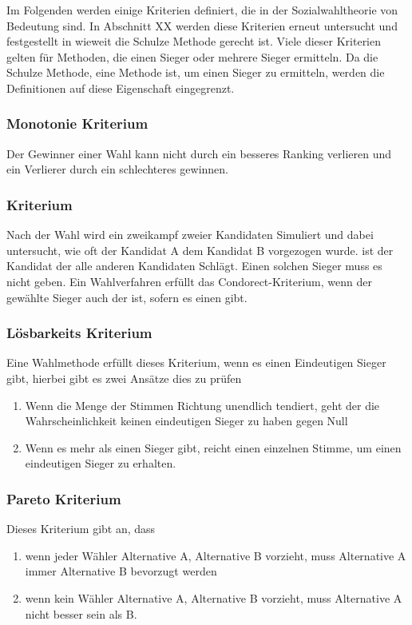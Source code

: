 Im Folgenden werden einige Kriterien definiert, die in der Sozialwahltheorie von Bedeutung sind. In Abschnitt XX werden diese Kriterien erneut untersucht und festgestellt in wieweit die Schulze Methode gerecht ist. Viele dieser Kriterien gelten für Methoden, die einen Sieger oder mehrere Sieger ermitteln. Da die Schulze Methode, eine Methode ist, um einen Sieger zu ermitteln, werden die Definitionen auf diese Eigenschaft eingegrenzt.

\subsubsection{Monotonie Kriterium} 
\label{sec:monotoniekriterium}
Der Gewinner einer Wahl kann nicht durch ein besseres Ranking verlieren und ein Verlierer durch ein schlechteres gewinnen. \cite{Woodall1996}

\subsubsection{\condorcet Kriterium} 
\label{sec:condorectKriterium}
Nach der Wahl wird ein zweikampf zweier Kandidaten Simuliert und dabei untersucht, wie oft der Kandidat A dem Kandidat B vorgezogen wurde. \condorcetSieger ist der Kandidat der alle anderen Kandidaten Schlägt. Einen solchen Sieger muss es nicht geben. Ein Wahlverfahren erfüllt das Condorect-Kriterium, wenn der gewählte Sieger auch der \condorcetSieger ist, sofern es einen \condorcetSieger gibt. \cite{Johnson2005}

\subsubsection{Lösbarkeits Kriterium} 
\label{sec:loesbarkeitsKriterium}
Eine Wahlmethode erfüllt dieses Kriterium, wenn es einen Eindeutigen Sieger gibt, hierbei gibt es zwei Ansätze dies zu prüfen \citet{Schulze2017}
\begin{enumerate}
\item Wenn die Menge der Stimmen Richtung unendlich tendiert, geht der die Wahrscheinlichkeit keinen eindeutigen Sieger zu haben gegen Null 
\item Wenn es mehr als einen Sieger gibt, reicht einen einzelnen Stimme, um einen eindeutigen Sieger zu erhalten.
\end{enumerate}

\subsubsection{Pareto Kriterium} 
\label{sec:paretoKriterium}
Dieses Kriterium gibt an, dass
\begin{enumerate}
\item wenn jeder Wähler Alternative A, Alternative B vorzieht, muss Alternative A immer Alternative B bevorzugt werden
\item wenn kein Wähler Alternative A, Alternative B vorzieht, muss Alternative A nicht besser sein als B. \citet{Schulze2017}
\end{enumerate}


